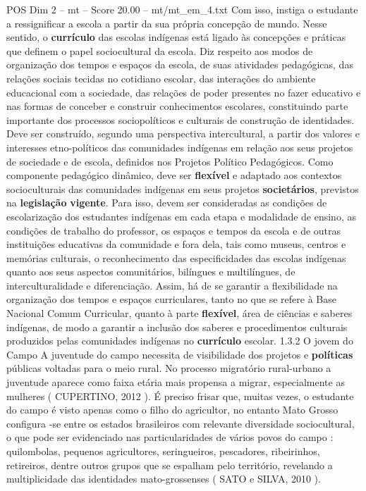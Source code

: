 \begin{textsample}{POS Dim 2 – mt – Score 20.00 – mt/mt\_em\_4.txt}
Com isso, instiga o estudante a ressignificar a escola a partir da sua própria concepção de mundo.
Nesse sentido, o \textbf{currículo} das escolas indígenas está ligado às concepções e práticas que definem o papel sociocultural da escola.
Diz respeito aos modos de organização dos tempos e espaços da escola, de suas atividades pedagógicas, das relações sociais tecidas no cotidiano escolar, das interações do ambiente educacional com a sociedade, das relações de poder presentes no fazer educativo e nas formas de conceber e construir conhecimentos escolares, constituindo parte importante dos processos sociopolíticos e culturais de construção de identidades.
Deve ser construído, segundo uma perspectiva intercultural, a partir dos valores e interesses etno-políticos das comunidades indígenas em relação aos seus projetos de sociedade e de escola, definidos nos Projetos Político Pedagógicos.
Como componente pedagógico dinâmico, deve ser \textbf{flexível} e adaptado aos contextos socioculturais das comunidades indígenas em seus projetos \textbf{societários}, previstos na \textbf{legislação} \textbf{vigente}.
Para isso, devem ser consideradas as condições de escolarização dos estudantes indígenas em cada etapa e modalidade de ensino, as condições de trabalho do professor, os espaços e tempos da escola e de outras instituições educativas da comunidade e fora dela, tais como museus, centros e memórias culturais, o reconhecimento das especificidades das escolas indígenas quanto aos seus aspectos comunitários, bilíngues e multilíngues, de interculturalidade e diferenciação.
Assim, há de se garantir a flexibilidade na organização dos tempos e espaços curriculares, tanto no que se refere à Base Nacional Comum Curricular, quanto à parte \textbf{flexível}, área de ciências e saberes indígenas, de modo a garantir a inclusão dos saberes e procedimentos culturais produzidos pelas comunidades indígenas no \textbf{currículo} escolar. 1.3.2 O jovem do Campo A juventude do campo necessita de visibilidade dos projetos e \textbf{políticas} públicas voltadas para o meio rural.
No processo migratório rural-urbano a juventude aparece como faixa etária mais propensa a migrar, especialmente as mulheres ( CUPERTINO, 2012 ).
É preciso frisar que, muitas vezes, o estudante do campo é visto apenas como o filho do agricultor, no entanto Mato Grosso configura -se entre os estados brasileiros com relevante diversidade sociocultural, o que pode ser evidenciado nas particularidades de vários povos do campo : quilombolas, pequenos agricultores, seringueiros, pescadores, ribeirinhos, retireiros, dentre outros grupos que se espalham pelo território, revelando a multiplicidade das identidades mato-grossenses ( SATO e SILVA, 2010 ).

\end{textsample}
